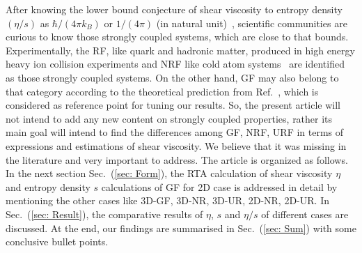 \documentclass[amsmath,amssymb,aps,prb]{revtex4-2}
\begin{document}
    After knowing the lower bound conjecture of shear viscosity to entropy density $(\eta/s)$ as $\hbar/(4\pi k_B)$ or $1/(4\pi)$ (in natural unit)~\cite{25Kovtun:2004de}, scientific communities are curious to know those strongly coupled systems, which are close to that bounds. Experimentally, the RF, like quark and hadronic matter, produced in high energy heavy ion collision experiments and NRF like cold atom systems~\cite{27Sch_fer_2009} are identified as those strongly coupled systems. On the other hand, GF may also belong to that category according to the theoretical prediction from Ref.~\cite{24PhysRevLett.103.025301}, which is considered as reference point for tuning our results. So, the present article will not intend to add any new content on strongly coupled properties, rather its main goal will intend to find the differences among GF, NRF, URF in terms of expressions and estimations of shear viscosity. We believe that it was missing in the literature and very important to address.
%
    The article is organized as follows. In the next section Sec.~(\ref{sec: Form}), the RTA calculation of shear viscosity $\eta$ and entropy density $s$ calculations of GF for 2D case is addressed in detail by mentioning the other cases like 3D-GF, 3D-NR, 3D-UR, 2D-NR, 2D-UR. In Sec.~(\ref{sec: Result}), the comparative results of $\eta$, $s$ and $\eta/s$ of different cases are discussed. At the end, our findings are summarised in Sec.~(\ref{sec: Sum}) with some conclusive bullet points.
%
\end{document}
